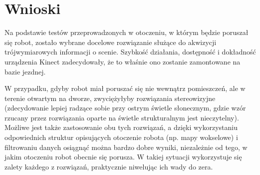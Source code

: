 \section{Wnioski}
Na podstawie testów przeprowadzonych w otoczeniu, w którym będzie poruszał się robot, zostało wybrane docelowe rozwiązanie służące do akwizycji trójwymiarowych informacji o scenie. Szybkość działania, dostępność i dokładność urządzenia Kinect zadecydowały, że to właśnie ono zostanie zamontowane na bazie jezdnej. 

W przypadku, gdyby robot miał poruszać się nie wewnątrz pomieszczeń, ale w terenie otwartym na dworze, zwyciężyłyby rozwiązania stereowizyjne (zdecydowanie lepiej radzące sobie przy ostrym świetle słonecznym, gdzie wzór rzucany przez rozwiązania oparte na świetle strukturalnym jest nieczytelny). Możliwe jest także zastosowanie obu tych rozwiązań, a dzięki wykorzystaniu odpowiednich struktur opisujących otoczenie robota (np. mapy wokselowe) i filtrowaniu danych osiągnąć można bardzo dobre wyniki, niezależnie od tego, w jakim otoczeniu robot obecnie się porusza. W takiej sytuacji wykorzystuje się zalety każdego z rozwiązań, praktycznie niwelując ich wady do zera.
